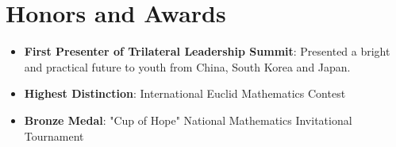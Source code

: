 \documentclass[letterpaper,11pt]{article}
\newcommand{\resumeItem}[2]{
  \item\small{
    \textbf{#1}{: #2 \vspace{0pt}}
  }
}
\newcommand{\resumeSubItem}[2]{\resumeItem{#1}{#2}\vspace{-1pt}}
\newcommand{\resumeSubHeadingListStart}{\begin{itemize}[leftmargin=*]}
\newcommand{\resumeSubHeadingListEnd}{\end{itemize}}
\begin{document}
\section{Honors and Awards}
  \resumeSubHeadingListStart
    \resumeSubItem{First Presenter of Trilateral Leadership Summit}
      {Presented a bright and practical future to youth from China, South Korea and Japan. }\vspace{-4pt}
    \resumeSubItem{Highest Distinction}
      {International Euclid Mathematics Contest}\vspace{-4pt}
    \resumeSubItem{Bronze Medal}
      {"Cup of Hope" National Mathematics Invitational Tournament}\vspace{-4pt}
  \resumeSubHeadingListEnd

\end{document}
